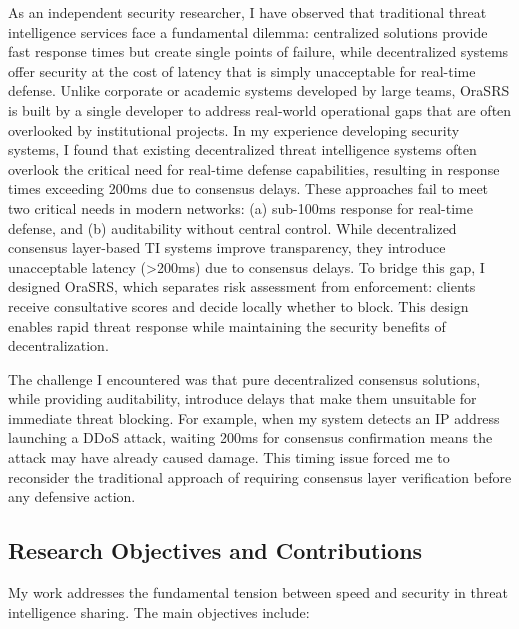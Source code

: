 \documentclass[12pt]{article}
\begin{document}
As an independent security researcher, I have observed that traditional threat intelligence services face a fundamental dilemma: centralized solutions provide fast response times but create single points of failure, while decentralized systems offer security at the cost of latency that is simply unacceptable for real-time defense. Unlike corporate or academic systems developed by large teams, OraSRS is built by a single developer to address real-world operational gaps that are often overlooked by institutional projects. In my experience developing security systems, I found that existing decentralized threat intelligence systems often overlook the critical need for real-time defense capabilities, resulting in response times exceeding 200ms due to consensus delays. These approaches fail to meet two critical needs in modern networks: (a) sub-100ms response for real-time defense, and (b) auditability without central control. While decentralized consensus layer-based TI systems improve transparency, they introduce unacceptable latency (>200ms) due to consensus delays. To bridge this gap, I designed OraSRS, which separates risk assessment from enforcement: clients receive consultative scores and decide locally whether to block. This design enables rapid threat response while maintaining the security benefits of decentralization.

The challenge I encountered was that pure decentralized consensus solutions, while providing auditability, introduce delays that make them unsuitable for immediate threat blocking. For example, when my system detects an IP address launching a DDoS attack, waiting 200ms for consensus confirmation means the attack may have already caused damage. This timing issue forced me to reconsider the traditional approach of requiring consensus layer verification before any defensive action.

\subsection{Research Objectives and Contributions}

My work addresses the fundamental tension between speed and security in threat intelligence sharing. The main objectives include:
\end{document}
